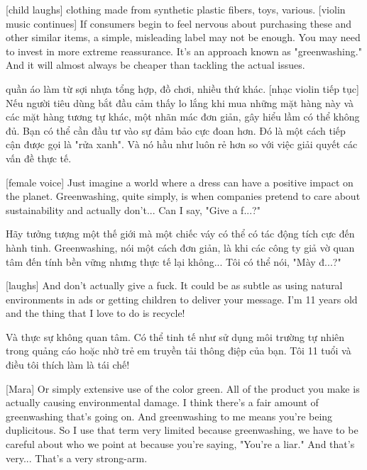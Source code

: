 \documentclass[a4paper]{article}
\begin{document}
	[child laughs]
	clothing made from synthetic plastic fibers,
	toys, various.
	[violin music continues]
	If consumers begin to feel nervous about purchasing these and other similar items, a simple, misleading label may not be enough.
	You may need to invest in more extreme reassurance.
	It's an approach known as "greenwashing."
	And it will almost always be cheaper than tackling the actual issues.
	
	\begin{vietnamese-v2}
		quần áo làm từ sợi nhựa tổng hợp,
		đồ chơi, nhiều thứ khác.
		[nhạc violin tiếp tục]
		Nếu người tiêu dùng bắt đầu cảm thấy lo lắng khi mua những mặt hàng này và các mặt hàng tương tự khác, một nhãn mác đơn giản, gây hiểu lầm có thể không đủ.
		Bạn có thể cần đầu tư vào sự đảm bảo cực đoan hơn.
		Đó là một cách tiếp cận được gọi là "rửa xanh".
		Và nó hầu như luôn rẻ hơn so với việc giải quyết các vấn đề thực tế.
	\end{vietnamese-v2}
	
	[female voice] Just imagine a world where a dress can have a positive impact on the planet.
	Greenwashing, quite simply, is when companies pretend to care about sustainability and actually don't... Can I say, "Give a f...?"
	
	\begin{vietnamese-v2}
		[giọng nữ] Hãy tưởng tượng một thế giới mà một chiếc váy có thể có tác động tích cực đến hành tinh.
		Greenwashing, nói một cách đơn giản, là khi các công ty giả vờ quan tâm đến tính bền vững nhưng thực tế lại không... Tôi có thể nói, "Mày đ...?"
	\end{vietnamese-v2}
	
	[laughs]
	And don't actually give a fuck.
	It could be as subtle as using natural environments in ads or getting children to deliver your message.
	I'm 11 years old and the thing that I love to do is recycle!

	\begin{vietnamese-v2}
		[cười]
		Và thực sự không quan tâm.
		Có thể tinh tế như sử dụng môi trường tự nhiên trong quảng cáo hoặc nhờ trẻ em truyền tải thông điệp của bạn.
		Tôi 11 tuổi và điều tôi thích làm là tái chế!
	\end{vietnamese-v2}

	[Mara] Or simply extensive use of the color green.
	All of the product you make is actually causing environmental damage.
	I think there's a fair amount of greenwashing that's going on.
	And greenwashing to me means you're being duplicitous.
	So I use that term very limited	because greenwashing, we have to be careful about who we point at because you're saying, "You're a liar."
	And that's very... That's a very strong-arm.
	
\end{document}
